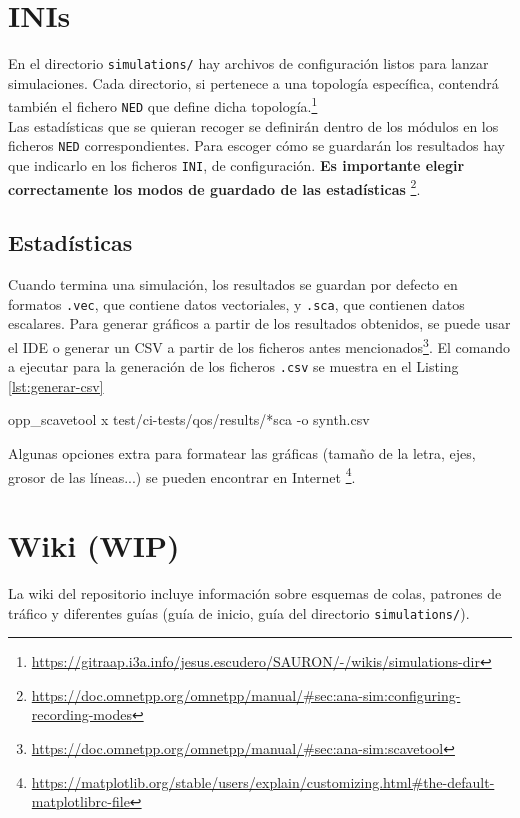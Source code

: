 \section{INIs}
En el directorio \verb|simulations/| hay archivos de configuración listos para lanzar simulaciones. Cada directorio, si pertenece a una topología específica, contendrá también el fichero \verb|NED| que define dicha topología.\footnote{\url{https://gitraap.i3a.info/jesus.escudero/SAURON/-/wikis/simulations-dir}}\\
Las estadísticas que se quieran recoger se definirán dentro de los módulos en los ficheros \verb|NED| correspondientes. Para escoger cómo se guardarán los resultados hay que indicarlo en los ficheros \verb|INI|, de configuración. \textbf{Es importante elegir correctamente los modos de guardado de las estadísticas} \footnote{\url{https://doc.omnetpp.org/omnetpp/manual/\#sec:ana-sim:configuring-recording-modes}}.

\subsection{Estadísticas}
Cuando termina una simulación, los resultados se guardan por defecto en formatos \verb|.vec|, que contiene datos vectoriales, y \verb|.sca|, que contienen datos escalares. Para generar gráficos a partir de los resultados obtenidos, se puede usar el IDE o generar un CSV a partir de los ficheros antes mencionados\footnote{\url{https://doc.omnetpp.org/omnetpp/manual/\#sec:ana-sim:scavetool}}. El comando a ejecutar para la generación de los ficheros \verb|.csv| se muestra en el Listing \ref{lst:generar-csv}

\begin{mycode}[style=bashstyle, label=lst:generar-csv, caption={Instrucción para generar un CSV a partir de los resultados.}]
opp_scavetool x test/ci-tests/qos/results/*sca -o synth.csv
\end{mycode}

Algunas opciones extra para formatear las gráficas (tamaño de la letra, ejes, grosor de las líneas...) se pueden encontrar en Internet \footnote{\url{https://matplotlib.org/stable/users/explain/customizing.html\#the-default-matplotlibrc-file}}.

\section{Wiki (WIP)}
La wiki del repositorio incluye información sobre esquemas de colas, patrones de tráfico y diferentes guías (guía de inicio, guía del directorio \verb|simulations/|).

